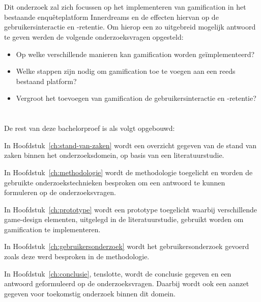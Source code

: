 \section{}
\label{sec:onderzoeksvraag}

Dit onderzoek zal zich focussen op het implementeren van gamification in het bestaande enquêteplatform Innerdreams en de effecten hiervan op de gebruikersinteractie en -retentie. Om hierop een zo uitgebreid mogelijk antwoord te geven werden de volgende onderzoeksvragen opgesteld:

\begin{itemize}
 \item Op welke verschillende manieren kan gamification worden geïmplementeerd?
 \item Welke stappen zijn nodig om gamification toe te voegen aan een reeds bestaand platform?
 \item Vergroot het toevoegen van gamification de gebruikersinteractie en -retentie?
\end{itemize}


\section{}
\label{sec:onderzoeksdoelstelling}

\section{}
\label{sec:opzet-bachelorproef}


De rest van deze bachelorproef is als volgt opgebouwd:

In Hoofdstuk~\ref{ch:stand-van-zaken} wordt een overzicht gegeven van de stand van zaken binnen het onderzoeksdomein, op basis van een literatuurstudie.

In Hoofdstuk~\ref{ch:methodologie} wordt de methodologie toegelicht en worden de gebruikte onderzoekstechnieken besproken om een antwoord te kunnen formuleren op de onderzoeksvragen.

In Hoofdstuk~\ref{ch:prototype} wordt een prototype toegelicht waarbij verschillende game-design elementen, uitgelegd in de literatuurstudie, gebruikt worden om gamification te implementeren.

In Hoofdstuk~\ref{ch:gebruikersonderzoek} wordt het gebruikersonderzoek gevoerd zoals deze werd besproken in de methodologie.

In Hoofdstuk~\ref{ch:conclusie}, tenslotte, wordt de conclusie gegeven en een antwoord geformuleerd op de onderzoeksvragen. Daarbij wordt ook een aanzet gegeven voor toekomstig onderzoek binnen dit domein.